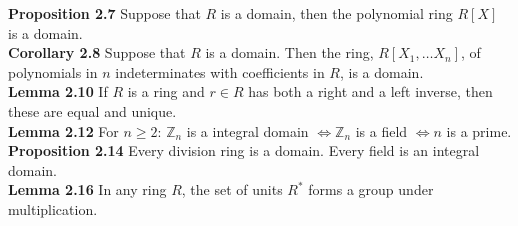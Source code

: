 \documentclass[a4paper]{article}
\begin{document}
\begin{framed}
	\noindent
	\textbf{Proposition 2.7} Suppose that $R$ is a domain, then the polynomial ring $R[X]$ is a domain.\\
	
	\noindent
	\textbf{Corollary 2.8} Suppose that $R$ is a domain. Then the ring, $R[X_1, \dots X_n]$, of polynomials in $n$ indeterminates with coefficients in $R$, is a domain.\\
	
	\noindent
	\textbf{Lemma 2.10} If $R$ is a ring and $r \in R$ has both a right and a left inverse, then these are equal and unique.\\
	
	\noindent
	\textbf{Lemma 2.12} For $n \geq 2$: $\mathbb{Z}_n$ is a integral domain $\iff \mathbb{Z}_n$ is a field $\iff n$ is a prime.\\
	
	\noindent
	\textbf{Proposition 2.14} Every division ring is a domain. Every field is an integral domain.\\
	
	\noindent
	\textbf{Lemma 2.16} In any ring $R$, the set of units $R^*$ forms a group under multiplication.
\end{framed}
\end{document}
